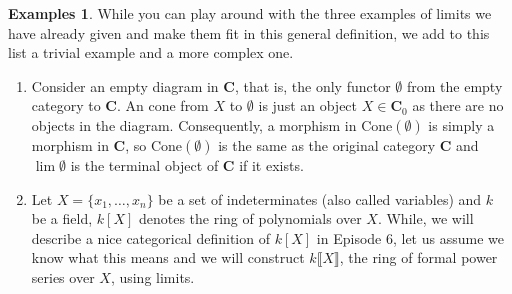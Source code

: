\documentclass{article}
\theoremstyle{definition}
\newtheorem{exmps}[thm]{Examples}
\theoremstyle{remark}
\begin{document}
\begin{exmps}
    While you can play around with the three examples of limits we have already given and make them fit in this general definition, we add to this list a trivial example and a more complex one.
    \begin{enumerate}
        \item Consider an empty diagram in $\mathbf{C}$, that is, the only functor $\emptyset$ from the empty category to $\mathbf{C}$. An cone from $X$ to $\emptyset$ is just an object $X \in \mathbf{C}_0$ as there are no objects in the diagram. Consequently, a morphism in $\text{Cone}(\emptyset)$ is simply a morphism in $\mathbf{C}$, so $\text{Cone}(\emptyset)$ is the same as the original category $\mathbf{C}$ and $\lim \emptyset$ is the terminal object of $\mathbf{C}$ if it exists.
        \item Let $X = \{x_1, \dots, x_n\}$ be a set of indeterminates (also called variables) and $k$ be a field, $k[X]$ denotes the ring of polynomials over $X$. While, we will describe a nice categorical definition of $k[X]$ in Episode 6, let us assume we know what this means and we will construct $k\llbracket X\rrbracket$, the ring of formal power series over $X$, using limits.
        

\end{enumerate}
\end{exmps}
\end{document}
